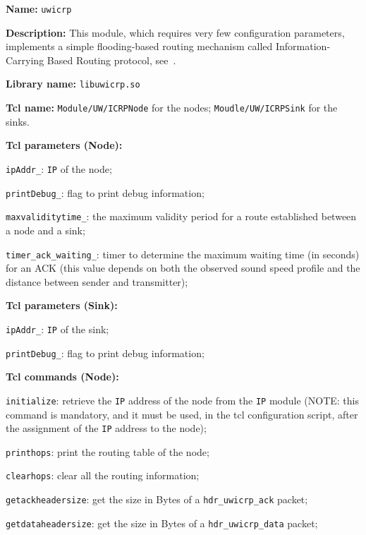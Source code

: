 \begin{description}
   \item {\bf Name:} {\tt uwicrp}
   \item {\bf Description:} This module, which requires very few configuration parameters, implements a simple flooding-based routing mechanism called Information-Carrying Based Routing protocol, see~\cite{LiangTakamatsu}.
   \item {\bf Library name:} {\tt libuwicrp.so}
   \item {\bf Tcl name:} {\tt Module/UW/ICRPNode} for the nodes; {\tt Moudle/UW/ICRPSink} for the sinks.
   \item {\bf Tcl parameters (Node):}
   \begin{description}
    \item {\tt ipAddr\_}: {\tt IP} of the node;
    \item {\tt printDebug\_}: flag to print debug information;
    \item {\tt maxvaliditytime\_}: the maximum validity period for a route established between a node and a sink;
    \item {\tt timer\_ack\_waiting\_}: timer to determine the maximum waiting time (in seconds) for an ACK (this value depends on both the observed sound speed profile and the distance between sender and transmitter);
   \end{description}
   \item {\bf Tcl parameters (Sink):}
   \begin{description}
    \item {\tt ipAddr\_}: {\tt IP} of the sink;
    \item {\tt printDebug\_}: flag to print debug information;
   \end{description}
   \item {\bf Tcl commands (Node):}
   \begin{description}
    \item {\tt initialize}: retrieve the {\tt IP} address of the node from the {\tt IP} module (NOTE: this command is mandatory, and it must be used, in the tcl configuration script, after the assignment of the {\tt IP} address to the node);
    \item {\tt printhops}: print the routing table of the node;
    \item {\tt clearhops}: clear all the routing information;
    \item {\tt getackheadersize}: get the size in Bytes of a {\tt hdr\_uwicrp\_ack} packet;
    \item {\tt getdataheadersize}: get the size in Bytes of a {\tt hdr\_uwicrp\_data} packet;

\end{description}
\end{description}
